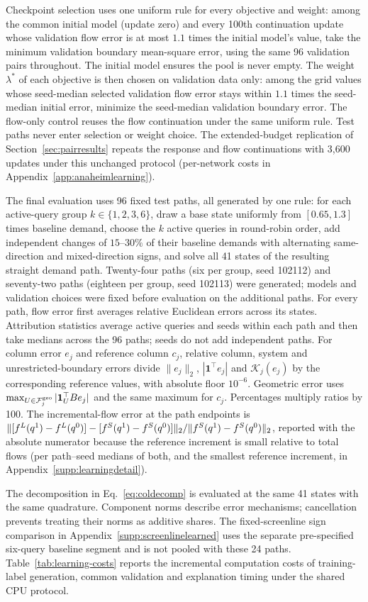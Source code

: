 Checkpoint selection uses one uniform rule for every objective and
weight: among the common initial model (update zero) and every 100th
continuation update whose validation flow error is at most $1.1$ times
the initial model's value, take the minimum validation boundary
mean-square error, using the same 96 validation pairs throughout. The
initial model ensures the pool is never empty. The weight $\lambda^*$ of
each objective is then chosen on validation data only: among the grid
values whose seed-median selected validation flow error stays within
$1.1$ times the seed-median initial error, minimize the seed-median
validation boundary error. The flow-only control reuses the flow
continuation under the same uniform rule. Test paths never enter
selection or weight choice. The extended-budget replication of
Section~\ref{sec:pairresults} repeats the response and flow
continuations with 3{,}600 updates under this unchanged protocol
(per-network costs in Appendix~\ref{app:anaheimlearning}).

The final evaluation uses 96 fixed test paths, all generated by one
rule: for each active-query group $k\in\{1,2,3,6\}$, draw a base state
uniformly from $[0.65,1.3]$ times baseline demand, choose the $k$
active queries in round-robin order, add independent changes of
$15$--$30\%$ of their baseline demands with alternating same-direction
and mixed-direction signs, and solve all 41 states of the resulting
straight demand path. Twenty-four paths (six per group, seed 102112)
and seventy-two paths (eighteen per group, seed 102113) were generated;
models and validation choices were fixed before evaluation on the
additional paths. For every path, flow error first averages relative
Euclidean errors across its states. Attribution statistics average active
queries and seeds within each path and then take medians across the 96 paths;
seeds do not add independent paths. For column error $e_j$ and reference column
$c_j$, relative column, system and unrestricted-boundary errors divide
$\|e_j\|_2$, $|\mathbf1^\top e_j|$ and $\mathcal K_j(e_j)$ by the
corresponding reference values, with absolute floor $10^{-6}$. Geometric error
uses $\max_{U\in\mathcal F_j^{\rm geo}}|\mathbf1_U^\top Be_j|$ and
the same maximum for $c_j$. Percentages multiply ratios by 100. The
incremental-flow error at the path endpoints is
$\lVert [f^L(q^1)-f^L(q^0)]-[f^S(q^1)-f^S(q^0)] \rVert_2/\lVert f^S(q^1)-f^S(q^0) \rVert_2$,
reported with the absolute numerator because the reference increment
is small relative to total flows (per path--seed medians of both, and
the smallest reference increment, in
Appendix~\ref{supp:learningdetail}).

The decomposition in Eq.~\eqref{eq:coldecomp} is evaluated at the same 41 states
with the same quadrature. Component norms describe error mechanisms; cancellation
prevents treating their norms as additive shares. The fixed-screenline sign
comparison in Appendix~\ref{supp:screenlinelearned} uses the separate
pre-specified six-query baseline segment and is not pooled with these 24 paths.
Table~\ref{tab:learning-costs} reports the incremental computation
costs of training-label generation, common validation and explanation
timing under the shared CPU protocol.

